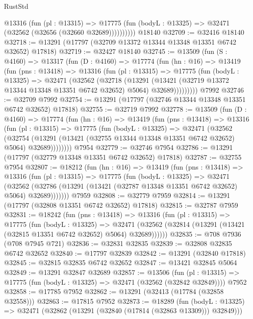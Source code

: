 \begin{lexlean}{RustStd}
\begin{coremodule}
            @13316
              (fun (pl : @13315) =>
              @17775 (fun (bodyL : @13325) => @32471 (@32562 (@32656 (@32660 @32689))))))))))
    @18140
@32709 := @32416 @18140
@32718 := @13291 (@17797 (@32709 @13372 @13344 @13348 @13351 @6742 @32652) @17818)
@32719 := @32427 @18140
@32745 := @13509
    (fun (S : @4160) =>
    @13317
      (fun (D : @4160) =>
      @17774
        (fun (hn : @16) =>
        @13419
          (fun (pns : @13418) =>
          @13316
            (fun (pl : @13315) =>
            @17775
              (fun (bodyL : @13325) =>
              @32471
                (@32562
                  (@32718
                    (@13291
                      (@13421 (@32719 @13372 @13344 @13348 @13351 @6742 @32652) @5064)
                      @32689)))))))))
    @7992
@32746 := @32709 @7992
@32754 := @13291 (@17797 (@32746 @13344 @13348 @13351 @6742 @32652) @17818)
@32755 := @32719 @7992
@32778 := @13509
    (fun (D : @4160) =>
    @17774
      (fun (hn : @16) =>
      @13419
        (fun (pns : @13418) =>
        @13316
          (fun (pl : @13315) =>
          @17775
            (fun (bodyL : @13325) =>
            @32471
              (@32562
                (@32754
                  (@13291 (@13421 (@32755 @13344 @13348 @13351 @6742 @32652) @5064) @32689))))))))
    @7954
@32779 := @32746 @7954
@32786 := @13291 (@17797 (@32779 @13348 @13351 @6742 @32652) @17818)
@32787 := @32755 @7954
@32807 := @18212
    (fun (hn : @16) =>
    @13419
      (fun (pns : @13418) =>
      @13316
        (fun (pl : @13315) =>
        @17775
          (fun (bodyL : @13325) =>
          @32471
            (@32562 (@32786 (@13291 (@13421 (@32787 @13348 @13351 @6742 @32652) @5064) @32689)))))))
    @7959
@32808 := @32779 @7959
@32814 := @13291 (@17797 (@32808 @13351 @6742 @32652) @17818)
@32815 := @32787 @7959
@32831 := @18242
    (fun (pns : @13418) =>
    @13316
      (fun (pl : @13315) =>
      @17775
        (fun (bodyL : @13325) =>
        @32471 (@32562 (@32814 (@13291 (@13421 (@32815 @13351 @6742 @32652) @5064) @32689))))))
@32835 := @708 @7936 (@708 @7945 @721)
@32836 := @32831 @32835
@32839 := @32808 @32835 @6742 @32652
@32840 := @17797 @32839
@32842 := @13291 (@32840 @17818)
@32845 := @32815 @32835 @6742 @32652
@32847 := @13421 @32845 @5064
@32849 := @13291 @32847 @32689
@32857 := @13506
    (fun (pl : @13315) => @17775 (fun (bodyL : @13325) => @32471 (@32562 (@32842 @32849))))
    @7952
@32858 := @17785 @7952
@32862 := @13291 (@32413 (@17784 (@32858 @32558)))
@32863 := @17815 @7952
@32873 := @18289
    (fun (bodyL : @13325) => @32471 (@32862 (@13291 (@32840 (@17814 (@32863 @13309))) @32849)))

\end{coremodule}
\end{lexlean}
